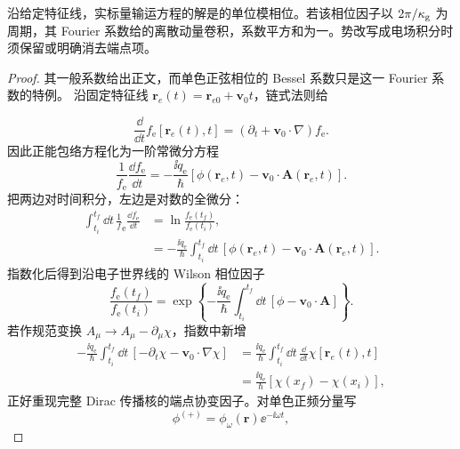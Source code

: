 \begin{proposition}
沿给定特征线，实标量输运方程的解是的单位模相位。若该相位因子以 $2\pi/\kappa_{\rm g}$ 为周期，其 Fourier 系数给的离散动量卷积，系数平方和为一。势改写成电场积分时须保留或明确消去端点项。
\end{proposition}
\begin{proof}
其一般系数给出正文，而单色正弦相位的 Bessel 系数只是这一 Fourier 系数的特例。 沿固定特征线 $\mathbf r_e(t)=\mathbf r_{e0}+\mathbf v_0t$，链式法则给

\begin{equation*}
\frac{\dd}{\dd t}f_{\mathrm e}[\mathbf r_e(t),t]
=(\partial_t+\mathbf v_0\cdot\nabla)f_{\mathrm e}.
\end{equation*}
因此正能包络方程化为一阶常微分方程
\begin{equation*}
\frac{1}{f_{\mathrm e}}\frac{\dd f_{\mathrm e}}{\dd t}
=-\frac{\ii q_{\mathrm e}}{\hbar}
[\phi(\mathbf r_e,t)-\mathbf v_0\cdot\mathbf A(\mathbf r_e,t)].
\end{equation*}
把两边对时间积分，左边是对数的全微分：
\begin{align*}
\int_{t_i}^{t_f}\dd t\,\frac1f_{\mathrm e}\frac{\dd f_{\mathrm e}}{\dd t}
&=\ln\frac{f_{\mathrm e}(t_f)}{f_{\mathrm e}(t_i)},\\
&=-\frac{\ii q_{\mathrm e}}{\hbar}\int_{t_i}^{t_f}\dd t\,
[\phi(\mathbf r_e,t)-\mathbf v_0\cdot\mathbf A(\mathbf r_e,t)].
\end{align*}
指数化后得到沿电子世界线的 Wilson 相位因子
\begin{equation*}
\frac{f_{\mathrm e}(t_f)}{f_{\mathrm e}(t_i)}
=\exp\!\left\{-\frac{\ii q_{\mathrm e}}{\hbar}\int_{t_i}^{t_f}\dd t\,
[\phi-\mathbf v_0\cdot\mathbf A]\right\}.
\end{equation*}
若作规范变换
$A_\mu\to A_\mu-\partial_\mu\chi$，指数中新增
\begin{align*}
-\frac{\ii q_{\mathrm e}}{\hbar}
\int_{t_i}^{t_f}\dd t\,
[-\partial_t\chi-\mathbf v_0\cdot\nabla\chi]
&=\frac{\ii q_{\mathrm e}}{\hbar}
\int_{t_i}^{t_f}\dd t\,\frac{\dd}{\dd t}\chi[\mathbf r_e(t),t]\\
&=\frac{\ii q_{\mathrm e}}{\hbar}[\chi(x_f)-\chi(x_i)],
\end{align*}
正好重现完整 Dirac 传播核的端点协变因子。对单色正频分量写
\begin{equation*}
\phi^{(+)}=\phi_\omega(\mathbf r)\ee^{-\ii\omega t},

\end{equation*}
\end{proof}
